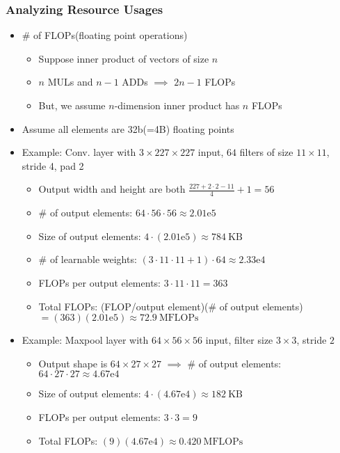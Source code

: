 \subsubsection*{Analyzing Resource Usages}
\begin{itemize}
    \item \# of FLOPs(floating point operations)
    \begin{itemize}
        \item Suppose inner product of vectors of size $n$
        \item $n$ MULs and $n-1$ ADDs $\implies$ $2n-1$ FLOPs
        \item But, we assume $n$-dimension inner product has $n$ FLOPs
    \end{itemize}
    \item Assume all elements are 32b(=4B) floating points
    \item Example: Conv. layer with $3\times227\times227$ input, $64$ filters of size $11\times11$, stride 4, pad 2
    \begin{itemize}
        \item Output width and height are both $\frac{227+2\cdot2-11}{4}+1=56$
        \item \# of output elements: $64\cdot56\cdot56\approx2.01\text{e}5$
        \item Size of output elements: $4\cdot(2.01\text{e}5)\approx784~\text{KB}$
        \item \# of learnable weights: $(3\cdot11\cdot11+1)\cdot64\approx2.33\text{e}4$
        \item FLOPs per output elements: $3\cdot11\cdot11=363$
        \item Total FLOPs: (FLOP/output element)(\# of output elements)$=(363)(2.01\text{e}5)\approx72.9~\text{MFLOPs}$
    \end{itemize}
    \item Example: Maxpool layer with $64\times56\times56$ input, filter size $3\times3$, stride $2$
    \begin{itemize}
        \item Output shape is $64\times27\times27$ $\implies$ \# of output elements: $64\cdot27\cdot27\approx4.67\text{e}4$
        \item Size of output elements: $4\cdot(4.67\text{e}4)\approx182~\text{KB}$
        \item FLOPs per output elements: $3\cdot3=9$
        \item Total FLOPs: $(9)(4.67\text{e}4)\approx0.420~\text{MFLOPs}$
    \end{itemize}
\end{itemize}

